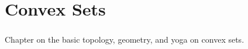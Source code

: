 \chapter{Convex Sets}
\label{chap:01}

\paragraph{}Chapter on the basic topology, geometry, and yoga on convex sets.







